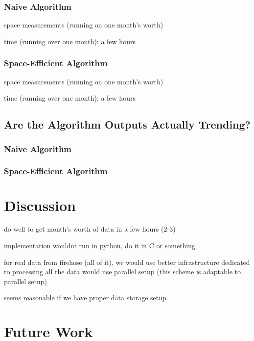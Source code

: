 \documentclass[twoside]{article}
\begin{document}
\begin{multicols}{2}
\subsubsection{Naive Algorithm}

space measurements (running on one month's worth)

time (running over one month): a few hours

\subsubsection{Space-Efficient Algorithm}

space measurements (running on one month's worth)

time (running over one month): a few hours

\subsection{Are the Algorithm Outputs Actually Trending?}

\subsubsection{Naive Algorithm}

\subsubsection{Space-Efficient Algorithm}



\section{Discussion}

do well to get month's worth of data in a few hours (2-3)

implementation wouldnt run in python, do it in C or something

for real data from firehose (all of it), we would use 
better infrastructure dedicated to processing all the data
would use parallel setup (this scheme is adaptable to parallel
setup)

seems reasonable if we have proper data storage setup.


\section{Future Work} \label{sec:Future Work}


\end{multicols}
\end{document}
